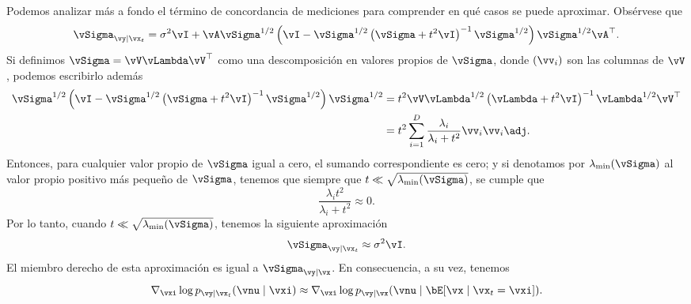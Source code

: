 \documentclass[../../book-main_es.tex]{subfiles}
\begin{document}
\begin{example}
    Podemos analizar más a fondo el término de concordancia de mediciones para
    comprender en qué casos
    se puede aproximar. Obsérvese que
    \begin{equation}
        \vSigma_{\vy \mid \vx_t}
        =
        \sigma^2 \vI + \vA\vSigma^{1/2} \left(
            \vI - \vSigma^{1/2}\left(
                \vSigma + t^2 \vI
            \right)^{-1}
            \vSigma^{1/2}
        \right)\vSigma^{1/2}\vA^\top.
    \end{equation}
    Si definimos $\vSigma = \vV \vLambda \vV^\top$ como una
    descomposición en valores propios
    de $\vSigma$, donde $(\vv_i)$ son las columnas de $\vV$, podemos escribirlo además
    \begin{align}
        \vSigma^{1/2}\left(
            \vI - \vSigma^{1/2}\left(
                \vSigma + t^2 \vI
            \right)^{-1}
            \vSigma^{1/2}
        \right) \vSigma^{1/2}
        &=
        t^2 \vV \vLambda^{1/2}\left(
            \vLambda + t^2 \vI
        \right)^{-1}
        \vLambda^{1/2}
        \vV^\top
        \\
        &=
        t^2 \sum_{i=1}^D
        \frac{\lambda_i}{\lambda_i + t^2}
        \vv_i \vv_i\adj.
    \end{align}
    Entonces, para cualquier valor propio de $\vSigma$ igual a cero, el
    sumando correspondiente
    es cero; y
    si denotamos por $\lambda_{\min}(\vSigma)$ al valor propio positivo más pequeño de
    $\vSigma$, tenemos
    que siempre que $t \ll
    \sqrt{\lambda_{\min}(\vSigma)}$, se cumple que
    \begin{equation}
        \frac{\lambda_i t^2}{\lambda_i + t^2} \approx 0.
    \end{equation}
    Por lo tanto, cuando $t \ll \sqrt{\lambda_{\min}(\vSigma)}$, tenemos la siguiente aproximación
    \begin{equation}
        \vSigma_{\vy \mid \vx_t} \approx \sigma^2 \vI.
    \end{equation}
    El miembro derecho de esta aproximación es igual a
    $\vSigma_{\vy \mid \vx}$.
    En consecuencia, a su vez, tenemos 
    \begin{equation}
        \nabla_{\vxi} \log p_{\vy \mid \vx_t}(\vnu \mid \vxi)
        \approx
        \nabla_{\vxi} \log p_{\vy \mid \vx}(\vnu \mid \bE[\vx \mid
        \vx_t = \vxi]).
        \label{eq:conditional-posterior-measurementmatching-gaussian-case-dps-approx}
    \end{equation}

\end{example}
\end{document}
